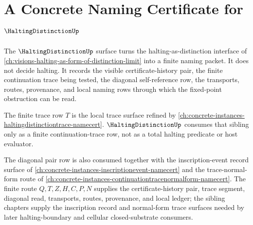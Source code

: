 \chapter{A Concrete Naming Certificate for $\HaltingDistinctionUp$}
\label{ch:concrete-instances-haltingdistinction-namecert}

The $\HaltingDistinctionUp$ surface turns the halting-as-distinction interface of \autoref{ch:visions-halting-as-form-of-distinction-limit} into a finite naming packet. It does not decide halting. It records the visible certificate-history pair, the finite continuation trace being tested, the diagonal self-reference row, the transports, routes, provenance, and local naming rows through which the fixed-point obstruction can be read.

The finite trace row $T$ is the local trace surface refined by \autoref{ch:concrete-instances-haltingdistinctiontrace-namecert}. $\HaltingDistinctionUp$ consumes that sibling only as a finite continuation-trace row, not as a total halting predicate or host evaluator.

The diagonal pair row is also consumed together with the inscription-event record surface of \autoref{ch:concrete-instances-inscriptionevent-namecert} and the trace-normal-form route of \autoref{ch:concrete-instances-continuationtracenormalform-namecert}. The finite route $Q,T,Z,H,C,P,N$ supplies the certificate-history pair, trace segment, diagonal read, transports, routes, provenance, and local ledger; the sibling chapters supply the inscription record and normal-form trace surfaces needed by later halting-boundary and cellular closed-substrate consumers.

